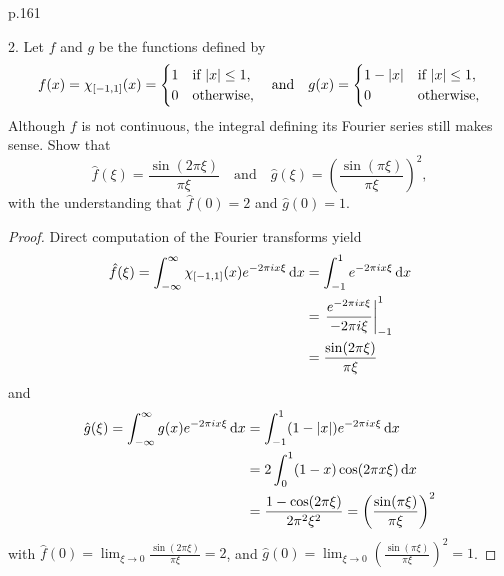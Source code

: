 \documentclass[11pt]{article}
\newcommand{\br}[1]{\left(#1\right)}
\begin{document}
p.161

2. Let $f$ and $g$ be the functions defined by \[f(x) = \chi_{[-1,1]}(x) = \begin{cases}
  1 & \text{if } \abs{x}\leq 1,\\
  0 & \text{otherwise,}
\end{cases} \quad \text{and}\quad g(x) = \begin{cases}
  1-\abs{x} & \text{if } \abs{x}\leq 1,\\
  0 & \text{otherwise},
\end{cases}\]
Although $f$ is not continuous, the integral defining its Fourier series still makes sense. Show that \[\hat{f}(\xi) = \frac{\sin(2\pi\xi)}{\pi\xi}\quad \text{and}\quad \hat{g}(\xi) = \br{\frac{\sin(\pi\xi)}{\pi\xi}}^2,\] with the understanding that $\hat{f}(0) = 2$ and $\hat{g}(0) = 1$.
\begin{proof}
  Direct computation of the Fourier transforms yield \begin{align*}
    \hat{f}(\xi) = \int_{-\infty}^{\infty} \chi_{[-1,1]}(x) e^{-2\pi i x \xi}\dd{x} &= \int_{-1}^{1} e^{-2\pi i x \xi}\dd{x}\\
    &= \eval{\frac{e^{-2\pi i x \xi}}{-2\pi i \xi }}_{-1}^{1}\\
    &= \frac{\sin(2\pi\xi)}{\pi\xi}
  \end{align*}
  and \begin{align*}
    \hat{g}(\xi) = \int_{-\infty}^{\infty} g(x)e^{-2\pi i x \xi}\dd{x} &= \int_{-1}^1 (1-\abs{x})e^{-2\pi i x \xi}\dd{x}\\
    &= 2\int_0^1 (1-x)\cos(2\pi x \xi)\dd{x}\\
    &= \frac{1-\cos(2\pi\xi)}{2\pi^2\xi^2} = \br{\frac{\sin(\pi\xi)}{\pi\xi}}^2
  \end{align*}
  with $\hat{f}(0) = \lim_{\xi\to 0} \frac{\sin(2\pi\xi)}{\pi\xi} = 2$, and $\hat{g}(0) = \lim_{\xi\to 0} \br{\frac{\sin(\pi\xi)}{\pi\xi}}^2 = 1$.
\end{proof}
\end{document}
